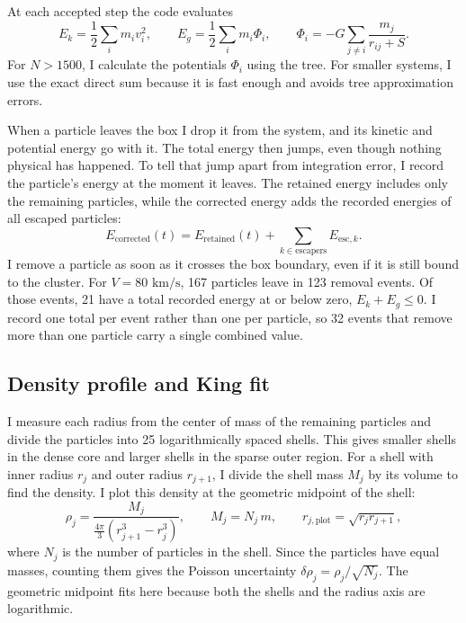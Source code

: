 \documentclass[12pt,a4paper]{article}
\begin{document}
At each accepted step the code evaluates
\begin{equation}\label{eq:energy}
    E_k=\frac12\sum_i m_i v_i^2,
    \qquad E_g=\frac12\sum_i m_i\Phi_i,
    \qquad \Phi_i=-G\sum_{j\ne i}\frac{m_j}{r_{ij}+S}.
\end{equation}
For $N>1500$, I calculate the potentials $\Phi_i$ using the tree. For smaller systems, I use the exact direct sum because it is fast enough and avoids tree approximation errors.

When a particle leaves the box I drop it from the system, and its kinetic and potential energy go with it. The total energy then jumps, even though nothing physical has happened. To tell that jump apart from integration error, I record the particle's energy at the moment it leaves. The retained energy includes only the remaining particles, while the corrected energy adds the recorded energies of all escaped particles:
\begin{equation}
    E_{\mathrm{corrected}}(t) = E_{\mathrm{retained}}(t) + \sum_{k \in \mathrm{escapers}} E_{\mathrm{esc}, k}.
\end{equation}
I remove a particle as soon as it crosses the box boundary, even if it is still bound to the cluster. For $V=80\text{ km/s}$, 167 particles leave in 123 removal events. Of those events, 21 have a total recorded energy at or below zero, $E_k+E_g\leq0$. I record one total per event rather than one per particle, so 32 events that remove more than one particle carry a single combined value.

\subsection{Density profile and King fit}

I measure each radius from the center of mass of the remaining particles and divide the particles into 25 logarithmically spaced shells. This gives smaller shells in the dense core and larger shells in the sparse outer region. For a shell with inner radius $r_j$ and outer radius $r_{j+1}$, I divide the shell mass $M_j$ by its volume to find the density. I plot this density at the geometric midpoint of the shell:
\begin{equation}
    \rho_j=\frac{M_j}{\frac{4\pi}{3}(r_{j+1}^3-r_j^3)},
    \qquad M_j = N_j\,m,
    \qquad r_{j,\mathrm{plot}}=\sqrt{r_jr_{j+1}},
\end{equation}
where $N_j$ is the number of particles in the shell. Since the particles have equal masses, counting them gives the Poisson uncertainty $\delta\rho_j = \rho_j / \sqrt{N_j}$. The geometric midpoint fits here because both the shells and the radius axis are logarithmic.
\end{document}
